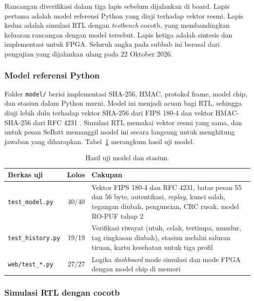 \documentclass[11pt,a4paper]{article}
\begin{document}
Rancangan diverifikasi dalam tiga lapis sebelum dijalankan di board. Lapis pertama adalah model
referensi Python yang diuji terhadap vektor resmi. Lapis kedua adalah simulasi RTL dengan
\textit{testbench} cocotb, yang membandingkan keluaran rancangan dengan model tersebut. Lapis
ketiga adalah sintesis dan implementasi untuk FPGA. Seluruh angka pada subbab ini berasal dari
pengujian yang dijalankan ulang pada 22 Oktober 2026.

\subsubsection*{Model referensi Python}

Folder \texttt{model/} berisi implementasi SHA-256, HMAC, protokol frame, model chip, dan stasiun
dalam Python murni. Model ini menjadi acuan bagi RTL, sehingga diuji lebih dulu terhadap vektor
SHA-256 dari FIPS 180-4 \cite{fips180} dan vektor HMAC-SHA-256 dari RFC 4231 \cite{rfc4231}.
Simulasi RTL memakai vektor resmi yang sama, dan untuk pesan SeBatt memanggil model ini secara
langsung untuk menghitung jawaban yang diharapkan. Tabel~\ref{tab:ujimodel} merangkum hasil uji
model.

\begin{table}[H]
  \centering
  \small
  \begin{tabularx}{\textwidth}{l r X}
    \toprule
    Berkas uji & Lolos & Cakupan \\
    \midrule
    \texttt{test\_model.py} & 40/40 & Vektor FIPS 180-4 dan RFC 4231, batas pesan 55 dan 56 byte,
      autentikasi, \textit{replay}, kunci salah, tegangan diubah, penguncian, CRC rusak, model
      RO-PUF tahap 2 \\
    \texttt{test\_history.py} & 19/19 & Verifikasi riwayat (utuh, celah, tertimpa, mundur, tag
      ringkasan diubah), stasiun melalui saluran tiruan, kartu kesehatan untuk tiga profil \\
    \texttt{web/test\_*.py} & 27/27 & Logika \textit{dashboard} mode simulasi dan mode FPGA dengan
      model chip di memori \\
    \bottomrule
  \end{tabularx}
  \caption{Hasil uji model dan stasiun.}
  \label{tab:ujimodel}
\end{table}

\subsubsection*{Simulasi RTL dengan cocotb}
\end{document}
